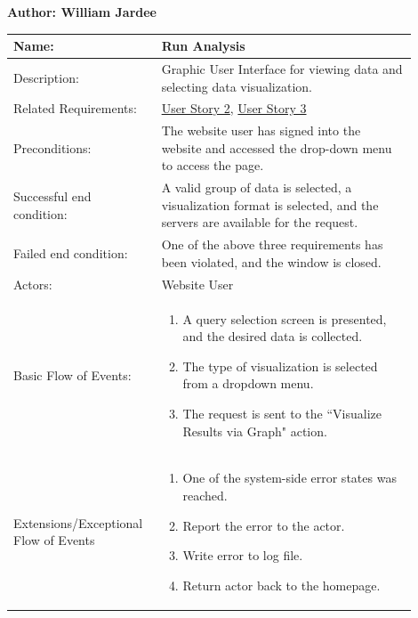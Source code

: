 \documentclass[11pt]{article}
\begin{document}
\begin{table}[!ht]
\begin{center}
\textbf{Author: William Jardee}
\vspace*{1em}

\begin{tabular}{p{0.30\linewidth}p{0.60\linewidth}}
	Name: & Run Analysis\\\hline
	Description: & Graphic User Interface for viewing data and selecting data visualization.\\\hline
	Related Requirements:& \hyperlink{us2}{User Story 2}, \hyperlink{us3}{User Story 3}\\\hline
	Preconditions:& The website user has signed into the website and accessed the drop-down menu to access the page. \\\hline
	Successful end condition:& A valid group of data is selected, a visualization format is selected, and the servers are available for the request.\\\hline
	Failed end condition:& One of the above three requirements has been violated, and the window is closed.\\\hline
	Actors:& Website User\\\hline
	Basic Flow of Events: & \begin{enumerate}
	\item A query selection screen is presented, and the desired data is collected.
	\item The type of visualization is selected from a dropdown menu.
	\item The request is sent to the ``Visualize Results via Graph" action.
	\end{enumerate}\\\hline
	Extensions/Exceptional Flow of Events & \begin{enumerate}
	\item One of the system-side error states was reached.
	\item Report the error to the actor.
	\item Write error to log file.
	\item Return actor back to the homepage.
	\end{enumerate}
\end{tabular}
\label{des:run_anal}	
\end{center}
\end{table}
\end{document}
